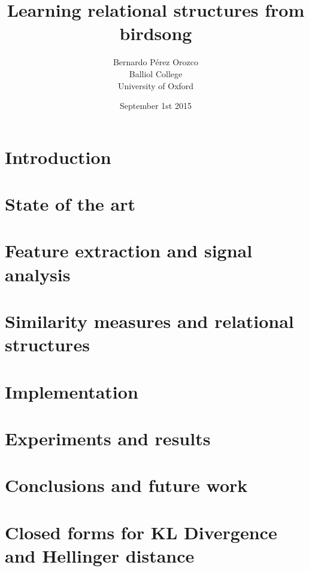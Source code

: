 \documentclass[pdftex,12pt,a4paper]{report}
\title{Learning relational structures from birdsong}
\author{Bernardo Pérez Orozco\\Balliol College\\University of Oxford}
\date{ September 1st 2015 }
\theoremstyle{definition}
\theoremstyle{remark}
\begin{document}
 

\tableofcontents
\newpage
\chapter{Introduction}

 
\chapter{State of the art}



\chapter{Feature extraction and signal analysis}
 

 
\chapter{Similarity measures and relational structures}



\chapter{Implementation}



\chapter{Experiments and results}



\chapter{Conclusions and future work}



\appendix

\chapter{Closed forms for KL Divergence and Hellinger distance}





\end{document}
